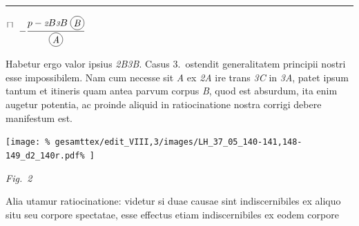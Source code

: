 %
\pend \vspace{-4ex} 
%
\pstart\noindent  
\rule[-0mm]{31mm}{0mm}$\displaystyle\efrac{\sqcap}{}$ $-\displaystyle\frac{p-{\scriptstyle \textit{2}}B{\scriptstyle \textit{3}}B\;\raisebox{-1.0ex}{\begin{tikzpicture}\draw (0,0) circle (0.25cm) node {\textit{B}};\end{tikzpicture}}}{\raisebox{-1.0ex}{\begin{tikzpicture}\draw (0,0) circle (0.25cm) node {\textit{A}};\end{tikzpicture}}}$\hfill
\pend
%
\pstart\noindent
\protect\rule[0cm]{0mm}{12pt}Habetur ergo valor ipsius \textit{{\scriptsize 2}B{\scriptsize 3}B}. 
\pend
\pstart 
\hspace{1mm}\hspace{-1mm}%
%
Casus 3.\ ostendit generalitatem principii nostri esse impossibilem. Nam cum necesse sit \textit{A} 
%
ex \textit{{\scriptsize2}A} ire trans \textit{{\scriptsize3}C} in \textit{{\scriptsize3}A}, patet ipsum tantum et 
%
%
itineris quam antea parvum corpus \textit{B}, quod est absurdum, ita enim augetur potentia\protect{}, ac proinde aliquid in ratiocinatione nostra corrigi debere manifestum est.%
%
%
\pend 
%
%
\vspace{0.8em} %
\centerline{%
\texttt{[image: \%
gesamttex/edit\_VIII,3/images/LH\_37\_05\_140-141,148-149\_d2\_140r.pdf\%
]}} 
\vspace{0em}
\centerline{%
\lbrack\textit{Fig.~2}\rbrack%
}
\vspace{1em}
%
\pstart
%
Alia
%
utamur ratiocinatione: videtur 
%
si duae causae\protect{}
%
sint indiscernibiles ex aliquo situ seu corpore 
%
%
spectatae, esse effectus etiam indiscernibiles\protect{} ex eodem corpore 
%
